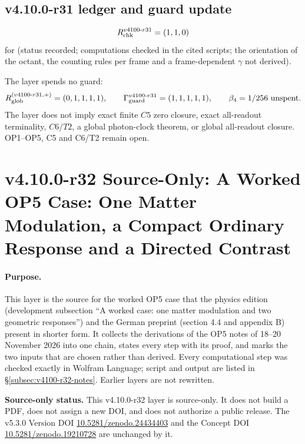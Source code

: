 \subsection*{v4.10.0-r31 ledger and guard update}
\label{subsec:v4100-r31-ledger-guard}

\[
R_{\rm chk}^{v4100\text{-}r31}=(1,1,0)
\]
for (status recorded; computations checked in the cited scripts; the orientation of the octant, the counting rules per frame and a
frame-dependent \(\gamma\) not derived).

The layer spends no guard:
\[
R_{\rm glob}^{(v4100\text{-}r31,+)}=(0,1,1,1,1),
\qquad
\Gamma_{\rm guard}^{v4100\text{-}r31}=(1,1,1,1,1),
\qquad
\beta_4=1/256\ \text{unspent}.
\]
The layer does not imply exact finite \(C5\) zero closure, exact all-readout terminality, \(C6/T2\), a global photon-clock theorem,
or global all-readout closure.  OP1--OP5, C5 and C6/T2 remain open.

\clearpage
\section*{v4.10.0-r32 Source-Only: A Worked OP5 Case: One Matter Modulation, a Compact Ordinary Response and a Directed Contrast}
\label{sec:v4100-r32-op5-worked-case}

\paragraph{Purpose.}
This layer is the source for the worked OP5 case that the physics edition (development subsection ``A worked case: one matter
modulation and two geometric responses'') and the German preprint (section 4.4 and appendix B) present in shorter form.  It collects
the derivations of the OP5 notes of 18--20 November 2026 into one chain, states every step with its proof, and marks the two inputs
that are chosen rather than derived.  Every computational step was checked exactly in Wolfram Language; script and output are listed
in \S\ref{subsec:v4100-r32-notes}.  Earlier layers are not rewritten.

\noindent\textbf{Source-only status.}
This v4.10.0-r32 layer is source-only.  It does not build a PDF, does not assign a new DOI,
and does not authorize a public release.  The v5.3.0 Version DOI
\href{https://doi.org/10.5281/zenodo.24434403}{10.5281/zenodo.24434403} and the Concept DOI
\href{https://doi.org/10.5281/zenodo.19210728}{10.5281/zenodo.19210728} are unchanged by it.

